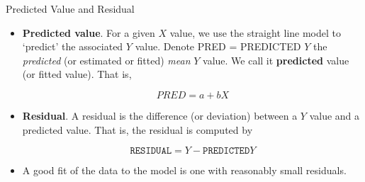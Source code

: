 \documentclass[14pt]{beamer}\usepackage[]{graphicx}\usepackage[]{color}
\begin{document}
\begin{frame}[fragile]{Predicted Value and Residual}

{\small{
\begin{itemize}
\item<1-> \textbf{Predicted value}. For a given $X$ value, we use the straight line  model to `predict' the associated $Y$ value. Denote
PRED = PREDICTED $Y$ the \textit{predicted} (or estimated or fitted)  \textit{mean} $Y$ value. We call it \textbf{predicted} value (or fitted value). That  is,

\vspace{-1mm}

{\footnotesize{
\begin{equation*}
PRED = a + bX
\end{equation*}
}}

\vspace{-6mm}

\item<2-> \textbf{Residual}. A residual is the difference (or deviation) between a $Y$ value and a predicted value. That is, the residual is computed by

\vspace{-3mm}

{\footnotesize{
\begin{equation*}
\texttt{RESIDUAL} = Y - \texttt{PREDICTED} Y
\end{equation*}
}}

\vspace{-4mm}

\item<3-> A good fit of the data to the model is one with reasonably small  residuals.
\end{itemize}
}}
\end{frame}
\end{document}
